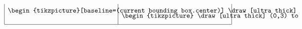 \begin{center}
{{\begin{minipage}{0.96\textwidth}
\begin{align*}
\begin{array}{|c|c|c|}
                \parbox{0.45\textwidth}{\centering
                    \vspace{5.5pt}
                    \begin{tikzpicture}[baseline=(current bounding box.center)]
                        \draw[ultra thick] (0,0) to [out=80, in=190] (3,3);
                    \end{tikzpicture}
                    \vspace{5.5pt}
                } &
                \parbox{0.45\textwidth}{\centering
                    \vspace{5.5pt}
                    \begin{tikzpicture}
                        \draw[ultra thick] (0,3) to [out=350, in=100] (3,0);
                    \end{tikzpicture}
                } \\
                \hline
            \end{array}
        \end{align*}
    \end{minipage}}}
\end{center}

